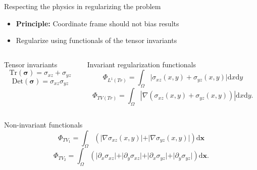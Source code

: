 \documentclass[presentation]{beamer}
\newcommand{\dd}{\mathrm{d}}
\newcommand{\bx}{\mathbf{x}}
\begin{document}
\begin{frame}{Respecting the physics in regularizing the problem}
\small
\begin{itemize}
\item \textbf{Principle:} Coordinate frame should not bias results
\item Regularize using functionals of the tensor invariants
\end{itemize}
\begin{columns}
\begin{column}{0.35\textwidth}
\begin{block}{Tensor invariants}
\[
\textrm{Tr}(\boldsymbol\sigma) = \sigma_{xz} + \sigma_{yz}
\]
\[
\textrm{Det}(\boldsymbol\sigma) = \sigma_{xz}\sigma_{yz}
\]
\end{block}
\end{column}
\begin{column}{0.6\textwidth}
\begin{exampleblock}{Invariant regularization functionals}
\[
\Phi_{L^1(Tr)} = \int_\Omega \vert \sigma_{xz}(x,y) + \sigma_{yz}(x,y)  \vert \dd x\dd y
\]
\[
\Phi_{TV(Tr)} =  \int_\Omega | \nabla(\sigma_{xz}(x,y) + \sigma_{yz}(x,y) ) | \dd x\dd y.
\]

\end{exampleblock}
\end{column}
\end{columns}
\begin{block}{Non-invariant functionals}
\[
 \Phi_{TV_1} = \int_\Omega \left( \vert\nabla\sigma_{xz}(x,y) \vert + \vert\nabla\sigma_{yz}(x,y) \vert\right)\dd\bx
\]
\[
\Phi_{TV_2} = \int_\Omega  \left( \vert\partial_x\sigma_{xz}\vert + \vert\partial_y\sigma_{xz}\vert + \vert\partial_x\sigma_{yz}\vert+ \vert\partial_y\sigma_{yz}\vert\right)\dd\bx.
\]

\end{block}

\end{frame}
\end{document}
